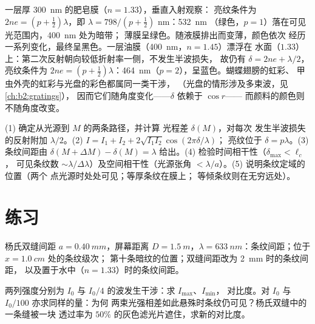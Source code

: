 \begin{example}[肥皂、油膜与蜻蜓]\label{ex:b2:two-wave-interference:colours}
一层厚 \qty{300}{nm} 的肥皂膜（$n = 1.33$），垂直入射观察：
亮纹条件为 $2ne = (p + \tfrac12)\lambda$，即 $\lambda = 798/(p + \tfrac12)$ nm：\qty{532}{nm}
（绿色，$p = 1$）落在可见光范围内，\qty{400}{nm} 处为暗带；
薄膜呈绿色。随液膜排出而变薄，颜色依次
经历一系列变化，最终呈黑色。一层油膜（\qty{400}{nm}，$n = 1.45$）漂浮在
水面（$1.33$）上：第二次反射朝向较低折射率一侧，不发生半波损失，
故仍有 $\delta = 2ne + \lambda/2$，亮纹条件为 $2ne =
(p + \tfrac12)\lambda$：\qty{464}{nm}（$p = 2$），呈蓝色。蝴蝶翅膀的虹彩、
甲虫外壳的虹彩与光盘的彩色都属同一类干涉，
（光盘的情形涉及多束波，见\cref{ch:b2:gratings}），
因而它们随角度变化——$\delta$ 依赖于 $\cos r$——
而颜料的颜色则不随角度改变。
\end{example}

\begin{method}[求解干涉问题]\label{met:b2:two-wave-interference:method}
(1) 确定从光源到 $M$ 的两条路径，并计算
光程差 $\delta(M)$，对每次
发生半波损失的反射附加 $\lambda/2$。(2) $I = I_1 + I_2 + 2\sqrt{I_1I_2}\cos(2\pi\delta/\lambda)$；
亮纹位于 $\delta = p\lambda$。(3) 条纹间距由 $\delta(M + \Delta M) - \delta(M) =
\lambda$ 给出。(4) 检验时间相干性（$\delta_{\max} < \ell_c$，
可见条纹数 $\sim\lambda/\Delta\lambda$）及空间相干性（光源张角
$< \lambda/a$）。(5) 说明条纹定域的位置（两个
点光源时处处可见；等厚条纹在膜上；
等倾条纹则在无穷远处）。
\end{method}

\section{练习}

\begin{exercise}[$\star$]\label{exo:b2:two-wave-interference:1}
杨氏双缝间距 $a = \qty{0.40}{mm}$，屏幕距离 $D = \qty{1.5}{m}$，$\lambda =
\qty{633}{nm}$：条纹间距；位于 $x = \qty{1.0}{cm}$ 处的条纹级次；
第十条暗纹的位置；双缝间距改为 \qty{2}{mm} 时的条纹间距，
以及置于水中（$n = 1.33$）时的条纹间距。
\end{exercise}

\begin{exercise}[$\star$]\label{exo:b2:two-wave-interference:2}
两列强度分别为 $I_0$ 与 $I_0/4$ 的波发生干涉：求 $I_{\max}$、$I_{\min}$，
对比度。对 $I_0$ 与 $I_0/100$ 亦求同样的量：为何
两束光强相差如此悬殊时条纹仍可见？杨氏双缝中的一条缝被一块
透过率为 $50\%$ 的灰色滤光片遮住，求新的对比度。
\end{exercise}

